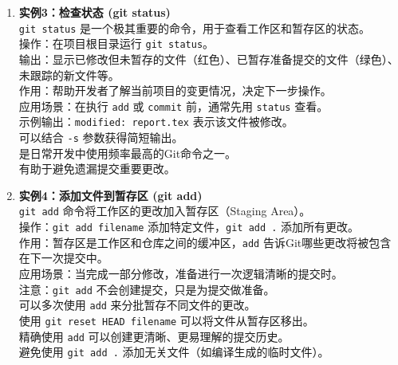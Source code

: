 \documentclass[a4paper, 12pt]{article}
\begin{document}
\begin{enumerate}
    \item \begin{tcolorbox}[instancestyle]
        \textbf{实例3：检查状态 (git status)} \\
        \texttt{git status} 是一个极其重要的命令，用于查看工作区和暂存区的状态。\\
        操作：在项目根目录运行 \texttt{git status}。\\
        输出：显示已修改但未暂存的文件（红色）、已暂存准备提交的文件（绿色）、未跟踪的新文件等。\\
        作用：帮助开发者了解当前项目的变更情况，决定下一步操作。\\
        应用场景：在执行 \texttt{add} 或 \texttt{commit} 前，通常先用 \texttt{status} 查看。\\
        示例输出：\texttt{modified:   report.tex} 表示该文件被修改。\\
        可以结合 \texttt{-s} 参数获得简短输出。\\
        是日常开发中使用频率最高的Git命令之一。\\
        有助于避免遗漏提交重要更改。
    \end{tcolorbox}

    \item \begin{tcolorbox}[instancestyle]
        \textbf{实例4：添加文件到暂存区 (git add)} \\
        \texttt{git add} 命令将工作区的更改加入暂存区（Staging Area）。\\
        操作：\texttt{git add filename} 添加特定文件，\texttt{git add .} 添加所有更改。\\
        作用：暂存区是工作区和仓库之间的缓冲区，\texttt{add} 告诉Git哪些更改将被包含在下一次提交中。\\
        应用场景：当完成一部分修改，准备进行一次逻辑清晰的提交时。\\
        注意：\texttt{git add} 不会创建提交，只是为提交做准备。\\
        可以多次使用 \texttt{add} 来分批暂存不同文件的更改。\\
        使用 \texttt{git reset HEAD filename} 可以将文件从暂存区移出。\\
        精确使用 \texttt{add} 可以创建更清晰、更易理解的提交历史。\\
        避免使用 \texttt{git add .} 添加无关文件（如编译生成的临时文件）。
    \end{tcolorbox}


\end{enumerate}
\end{document}
